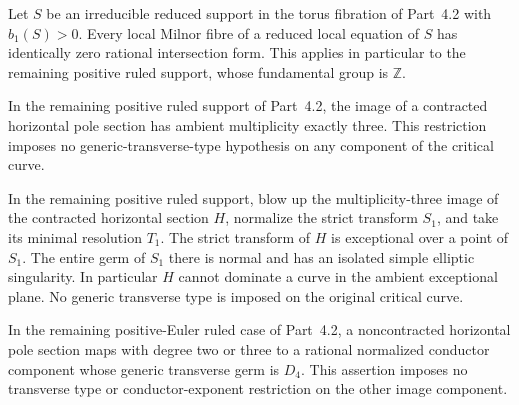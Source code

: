 
\begin{proposition}[P4.51]\hypertarget{tag-02XQ}{}\label{night:P4.51}\label{stmt:P4.51}


Let $S$ be an irreducible reduced support in the torus
fibration of Part~4.2 with $b_1(S)>0$. Every local
Milnor fibre of a reduced local equation of $S$ has
identically zero rational intersection form. This applies
in particular to the remaining positive ruled support,
whose fundamental group is $\mathbb Z$.
\end{proposition}

\begin{proposition}[P4.52]\hypertarget{tag-02XR}{}\label{night:P4.52}\label{stmt:P4.52}


In the remaining positive ruled support of Part~4.2,
the image of a contracted horizontal pole section has
ambient multiplicity exactly three. This restriction
imposes no generic-transverse-type hypothesis on
any component of the critical curve.
\end{proposition}

\begin{proposition}[P4.53]\hypertarget{tag-02XS}{}\label{night:P4.53}\label{stmt:P4.53}


In the remaining positive ruled support, blow up the
multiplicity-three image of the contracted horizontal
section $H$, normalize the strict transform $S_1$, and
take its minimal resolution $T_1$. The strict transform
of $H$ is exceptional over a point of $S_1$. The entire
germ of $S_1$ there is normal and has an isolated simple
elliptic singularity. In particular $H$ cannot dominate
a curve in the ambient exceptional plane. No generic
transverse type is imposed on the original critical curve.
\end{proposition}

\begin{proposition}[P4R.18]\hypertarget{tag-02YB}{}\label{night:P4R.18}\label{stmt:P4R.18}


In the remaining positive-Euler ruled case of Part~4.2, a
noncontracted horizontal pole section maps with degree two or
three to a rational normalized conductor component whose generic
transverse germ is $D_4$. This assertion imposes no transverse
type or conductor-exponent restriction on the other image component.
\end{proposition}

